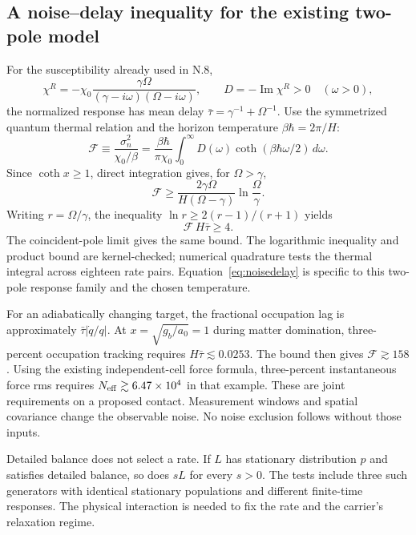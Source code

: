 \documentclass[11pt]{article}
\begin{document}
\subsection{A noise--delay inequality for the existing two-pole model}
For the susceptibility already used in N.8,
\begin{equation}
 \chi^R=-\chi_0\frac{\gamma\Omega}{(\gamma-i\omega)(\Omega-i\omega)},
 \qquad
 D=-\operatorname{Im}\chi^R>0\quad(\omega>0),
\end{equation}
the normalized response has mean delay
$\bar\tau=\gamma^{-1}+\Omega^{-1}$.
Use the symmetrized quantum thermal relation\cite{Clerk} and the horizon
temperature $\beta\hbar=2\pi/H$:
\begin{equation}
 \mathcal F\equiv\frac{\sigma_n^2}{\chi_0/\beta}
 =\frac{\beta\hbar}{\pi\chi_0}\int_0^\infty
 D(\omega)\coth(\beta\hbar\omega/2)\,d\omega.
\end{equation}
Since $\coth x\ge1$, direct integration gives, for $\Omega>\gamma$,
\begin{equation}
 \mathcal F\ge\frac{2\gamma\Omega}{H(\Omega-\gamma)}
                 \ln\frac\Omega\gamma.
\end{equation}
Writing $r=\Omega/\gamma$, the inequality
$\ln r\ge2(r-1)/(r+1)$ yields
\begin{equation}\label{eq:noisedelay}
 \boxed{\mathcal F\,H\bar\tau\ge4.}
\end{equation}
The coincident-pole limit gives the same bound. The logarithmic inequality
and product bound are kernel-checked; numerical quadrature tests the thermal
integral across eighteen rate pairs. Equation~\eqref{eq:noisedelay} is specific
to this two-pole response family and the chosen temperature.

For an adiabatically changing target, the fractional occupation lag is
approximately $\bar\tau|\dot q/q|$. At $x=\sqrt{g_b/a_0}=1$ during matter
domination, three-percent occupation tracking requires
$H\bar\tau\lesssim0.0253$. The bound then gives $\mathcal F\gtrsim158$.
Using the existing independent-cell force formula, three-percent instantaneous
force rms requires $N_{\rm eff}\gtrsim6.47\times10^4$ in that example.
These are joint requirements on a proposed contact. Measurement windows and
spatial covariance change the observable noise. No noise exclusion follows
without those inputs.

Detailed balance does not select a rate. If $L$ has stationary distribution
$p$ and satisfies detailed balance, so does $sL$ for every $s>0$. The tests
include three such generators with identical stationary populations and
different finite-time responses. The physical interaction is needed to fix
the rate and the carrier's relaxation regime.
\end{document}
